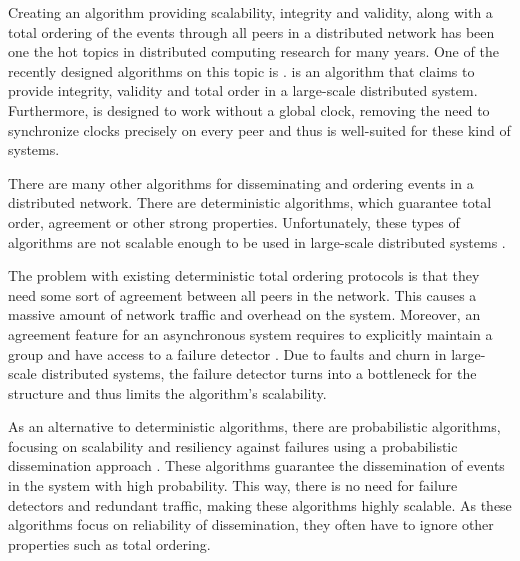 Creating an algorithm providing scalability, integrity and validity, along with a total ordering of the events through all peers in a distributed network has been one the hot topics in distributed computing research for many years. One of the recently designed algorithms on this topic is \epto \autocite{matos2015epto}. \epto is an algorithm that claims to provide integrity, validity and total order in a large-scale distributed system. Furthermore, \epto is designed to work without a global clock, removing the need to synchronize clocks precisely on every peer and thus is well-suited for these kind of systems.
\par 
There are many other algorithms for disseminating and ordering events in a distributed network. There are deterministic algorithms, which guarantee total order, agreement or other strong properties. Unfortunately, these types of algorithms are not scalable enough to be used in large-scale distributed systems \autocites[]{defago2004total}[]{lamport1978time}.
\par
The problem with existing deterministic total ordering protocols is that they need some sort of agreement between all peers in the network. This causes a massive amount of network traffic and overhead on the system.
Moreover, an agreement feature for an asynchronous system requires to
explicitly maintain a group and have access to a failure detector \autocites[]{chandra1996weakest}[]{chandra1996unreliable}. Due to faults and churn in large-scale distributed systems, the failure detector turns into a bottleneck for the structure and thus limits the algorithm's scalability.  
\par
As an alternative to deterministic algorithms, there are probabilistic algorithms, focusing on scalability and resiliency against failures using a probabilistic dissemination approach  \autocite{birman1999bimodal,carvalho2007emergent,demers1987epidemic,eugster2003lightweight,felber2002probabilistic,hayden1996probabilistic,kim2004gossip,Koldehofe02simplegossiping}. These algorithms guarantee the dissemination of events in the system with high probability. This way, there is no need for failure detectors and redundant traffic, making these algorithms highly scalable. As these algorithms focus on reliability of dissemination, they often have to ignore other properties such as total ordering.
\par
